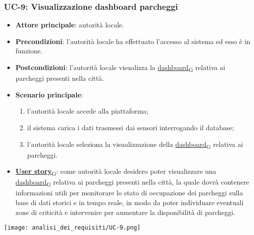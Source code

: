 \subsubsection{UC-9: Visualizzazione dashboard parcheggi}
\begin{itemize}
	\item \textbf{Attore principale}: autorità locale.
	\item \textbf{Precondizioni}: l'autorità locale ha effettuato l'accesso al sistema ed esso è in funzione.
	\item \textbf{Postcondizioni}: l'autorità locale visualizza la \href{https://7last.github.io/docs/rtb/documentazione-interna/glossario\#dashboard}{dashboard\textsubscript{G}} relativa
	      ai parcheggi presenti nella città.
	\item \textbf{Scenario principale}:
	      \begin{enumerate}
		      \item l'autorità locale accede alla piattaforma;
		      \item il sistema carica i dati trasmessi dai sensori interrogando il database;
		      \item l'autorità locale seleziona la visualizzazione della \href{https://7last.github.io/docs/rtb/documentazione-interna/glossario\#dashboard}{dashboard\textsubscript{G}} relativa ai parcheggi.
	      \end{enumerate}
	\item \href{https://7last.github.io/docs/rtb/documentazione-interna/glossario\#user-story}{\textbf{User story}\textsubscript{G}}:
	      come autorità locale desidero poter visualizzare una \href{https://7last.github.io/docs/rtb/documentazione-interna/glossario\#dashboard}{dashboard\textsubscript{G}} relativa ai parcheggi presenti nella città, la quale
	      dovrà contenere informazioni utili per monitorare lo stato di occupazione dei parcheggi sulla base di dati storici e in tempo reale,
	      in modo da poter individuare eventuali zone di criticità e intervenire per aumentare la disponibilità di parcheggi.
\end{itemize}
\begin{center}
	\texttt{[image: analisi\_dei\_requisiti/UC-9.png]}
\end{center}

\newpage

